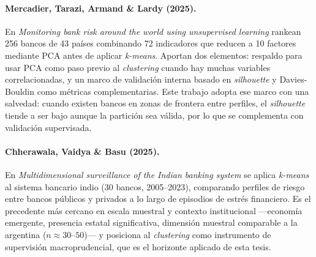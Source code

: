 \documentclass[11pt,a4paper]{article}
\begin{document}
\paragraph{Mercadier, Tarazi, Armand \& Lardy (2025).}
En \textit{Monitoring bank risk around the world using unsupervised learning}
\citep{mercadier2025} rankean 256 bancos de 43 países combinando 72 indicadores que reducen a 10
factores mediante PCA antes de aplicar \textit{k-means}. Aportan dos elementos: respaldo
para usar PCA como paso previo al \textit{clustering} cuando hay muchas variables
correlacionadas, y un marco de validación interna basado en \textit{silhouette} y
Davies-Bouldin como métricas complementarias. Este trabajo adopta ese marco con una salvedad: cuando existen bancos en zonas de frontera entre perfiles,
el \textit{silhouette} tiende a ser bajo aunque la partición sea válida, por lo que se complementa
con validación supervisada.

\paragraph{Chherawala, Vaidya \& Basu (2025).}
En \textit{Multidimensional surveillance of the Indian banking system} \citep{chherawala2025}
se aplica \textit{k-means} al sistema bancario indio (30 bancos, 2005--2023), comparando perfiles de
riesgo entre bancos públicos y privados a lo largo de episodios de estrés financiero. Es el
precedente más cercano en escala muestral y contexto institucional ---economía emergente, presencia
estatal significativa, dimensión muestral comparable a la argentina ($n \approx 30$--$50$)--- y
posiciona al \textit{clustering} como instrumento de supervisión macroprudencial, que es el horizonte
aplicado de esta tesis.
\end{document}

